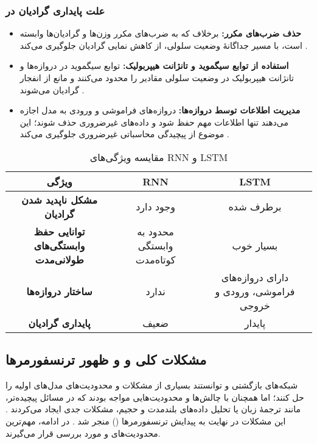 \subsubsection{علت پایداری گرادیان در }
\begin{itemize}
	\item \textbf{حذف ضرب‌های مکرر:}
	برخلاف  که به ضرب‌های مکرر وزن‌ها و گرادیان‌ها وابسته است،  با مسیر جداگانهٔ وضعیت سلولی، از کاهش نمایی گرادیان جلوگیری می‌کند
	\cite{hochreiter1998vanishing}.
	
	\item \textbf{استفاده از توابع سیگموید و تانژانت هیپربولیک:}
	توابع سیگموید در دروازه‌ها و تانژانت هیپربولیک در وضعیت سلولی مقادیر را محدود می‌کنند و مانع از انفجار گرادیان می‌شوند
	\cite{gers1999learning,goodfellow2016deep}.
	
	\item \textbf{مدیریت اطلاعات توسط دروازه‌ها:}
	دروازه‌های فراموشی و ورودی به مدل اجازه می‌دهند تنها اطلاعات مهم حفظ شود و داده‌های غیرضروری حذف شوند؛ این موضوع از پیچیدگی محاسباتی غیرضروری جلوگیری می‌کند
	\cite{hochreiter1997long}.
\end{itemize}




\begin{table}[h!]
	\centering
	\begin{tabular}{|c|c|c|}
		\hline
		\textbf{ویژگی} & \textbf{RNN} & \textbf{LSTM} \\ \hline
		\textbf{مشکل ناپدید شدن گرادیان} & وجود دارد & برطرف شده \\ \hline
		\textbf{توانایی حفظ وابستگی‌های طولانی‌مدت} & محدود به وابستگی کوتاه‌مدت & بسیار خوب \\ \hline
		\textbf{ساختار دروازه‌ها} & ندارد & دارای دروازه‌های فراموشی، ورودی و خروجی \\ \hline
		\textbf{پایداری گرادیان} & ضعیف & پایدار \\ \hline
	\end{tabular}
	\caption{مقایسه ویژگی‌های RNN و LSTM}
\end{table}



\subsection{مشکلات کلی  و  و ظهور ترنسفورمرها}
شبکه‌های بازگشتی  و  توانستند بسیاری از مشکلات و محدودیت‌های مدل‌های اولیه را حل کنند؛
اما همچنان با چالش‌ها و محدودیت‌هایی مواجه بودند که در مسائل پیچیده‌تر، مانند ترجمهٔ زبان یا تحلیل داده‌های بلندمدت و حجیم، مشکلات جدی ایجاد می‌کردند
\cite{hochreiter1997long,goodfellow2016deep}.
این مشکلات در نهایت به پیدایش ترنسفورمرها () منجر شد
\cite{vaswani2017attention}.
در ادامه، مهم‌ترین محدودیت‌های  و  مورد بررسی قرار می‌گیرند.

